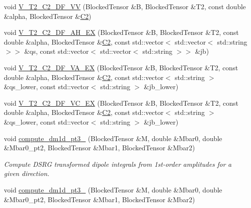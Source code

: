\begin{DoxyCompactItemize}
\item 
void \mbox{\hyperlink{classforte_1_1_d_s_r_g___m_r_p_t3_a0e00b4f4fdac4498d4d16c3f8cda54de}{V\+\_\+\+T2\+\_\+\+C2\+\_\+\+D\+F\+\_\+\+VV}} (Blocked\+Tensor \&B, Blocked\+Tensor \&T2, const double \&alpha, Blocked\+Tensor \&\mbox{\hyperlink{namespaceforte_abe00ec86d0015c0f2b6ac298c6e428e4af1a543f5a2c5d49bc5dde298fcf716e4}{C2}})
\item 
void \mbox{\hyperlink{classforte_1_1_d_s_r_g___m_r_p_t3_a2beafc4ba36ddc0c27557c0c858fbf85}{V\+\_\+\+T2\+\_\+\+C2\+\_\+\+D\+F\+\_\+\+A\+H\+\_\+\+EX}} (Blocked\+Tensor \&B, Blocked\+Tensor \&T2, const double \&alpha, Blocked\+Tensor \&\mbox{\hyperlink{namespaceforte_abe00ec86d0015c0f2b6ac298c6e428e4af1a543f5a2c5d49bc5dde298fcf716e4}{C2}}, const std\+::vector$<$ std\+::vector$<$ std\+::string $>$$>$ \&qs, const std\+::vector$<$ std\+::vector$<$ std\+::string $>$$>$ \&jb)
\item 
void \mbox{\hyperlink{classforte_1_1_d_s_r_g___m_r_p_t3_a3484a8491033f0e2171936ba0da11f38}{V\+\_\+\+T2\+\_\+\+C2\+\_\+\+D\+F\+\_\+\+V\+A\+\_\+\+EX}} (Blocked\+Tensor \&B, Blocked\+Tensor \&T2, const double \&alpha, Blocked\+Tensor \&\mbox{\hyperlink{namespaceforte_abe00ec86d0015c0f2b6ac298c6e428e4af1a543f5a2c5d49bc5dde298fcf716e4}{C2}}, const std\+::vector$<$ std\+::string $>$ \&qs\+\_\+lower, const std\+::vector$<$ std\+::string $>$ \&jb\+\_\+lower)
\item 
void \mbox{\hyperlink{classforte_1_1_d_s_r_g___m_r_p_t3_ab486aac4ea25510f0ca1d94b39d3e12d}{V\+\_\+\+T2\+\_\+\+C2\+\_\+\+D\+F\+\_\+\+V\+C\+\_\+\+EX}} (Blocked\+Tensor \&B, Blocked\+Tensor \&T2, const double \&alpha, Blocked\+Tensor \&\mbox{\hyperlink{namespaceforte_abe00ec86d0015c0f2b6ac298c6e428e4af1a543f5a2c5d49bc5dde298fcf716e4}{C2}}, const std\+::vector$<$ std\+::string $>$ \&qs\+\_\+lower, const std\+::vector$<$ std\+::string $>$ \&jb\+\_\+lower)
\item 
void \mbox{\hyperlink{classforte_1_1_d_s_r_g___m_r_p_t3_ab6ccdab98659f6661900cfa29fa6872d}{compute\+\_\+dm1d\+\_\+pt3\+\_}} (Blocked\+Tensor \&M, double \&Mbar0, double \&Mbar0\+\_\+pt2, Blocked\+Tensor \&Mbar1, Blocked\+Tensor \&Mbar2)
\begin{DoxyCompactList}\small\item\em Compute D\+S\+RG transformed dipole integrals from 1st-\/order amplitudes for a given direction. \end{DoxyCompactList}\item 
void \mbox{\hyperlink{classforte_1_1_d_s_r_g___m_r_p_t3_aa6f6e8955cf8ecbe07f6f0eb3522f649}{compute\+\_\+dm1d\+\_\+pt3\+\_}} (Blocked\+Tensor \&M, double \&Mbar0, double \&Mbar0\+\_\+pt2, Blocked\+Tensor \&Mbar1, Blocked\+Tensor \&Mbar2)

\end{DoxyCompactItemize}
